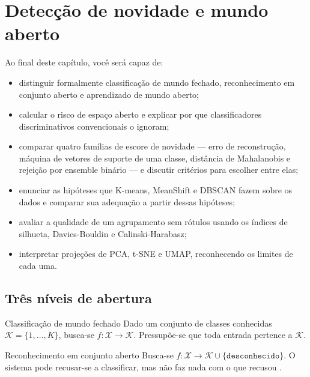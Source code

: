 \chapter{Detecção de novidade e mundo aberto}
\label{cap:novidades}

\begin{objetivos}
Ao final deste capítulo, você será capaz de:
\begin{itemize}[leftmargin=*,itemsep=0.2em]
  \item distinguir formalmente classificação de mundo fechado, reconhecimento em
        conjunto aberto e aprendizado de mundo aberto;
  \item calcular o risco de espaço aberto e explicar por que classificadores
        discriminativos convencionais o ignoram;
  \item comparar quatro famílias de escore de novidade --- erro de reconstrução,
        máquina de vetores de suporte de uma classe, distância de Mahalanobis e
        rejeição por ensemble binário --- e discutir critérios para escolher entre elas;
  \item enunciar as hipóteses que K-means, MeanShift e DBSCAN fazem sobre os dados e
        comparar sua adequação a partir dessas hipóteses;
  \item avaliar a qualidade de um agrupamento sem rótulos usando os índices de silhueta,
        Davies-Bouldin e Calinski-Harabasz;
  \item interpretar projeções de PCA, t-SNE e UMAP, reconhecendo os limites de cada uma.
\end{itemize}
\end{objetivos}

\section{Três níveis de abertura}

\begin{definicao}{Classificação de mundo fechado}
Dado um conjunto de classes conhecidas $\mathcal{K} = \{1, \dots, K\}$, busca-se
$f: \mathcal{X} \to \mathcal{K}$. Pressupõe-se que toda entrada pertence a
$\mathcal{K}$.
\end{definicao}

\begin{definicao}{Reconhecimento em conjunto aberto}
Busca-se $f: \mathcal{X} \to \mathcal{K} \cup \{\texttt{desconhecido}\}$. O sistema pode
recusar-se a classificar, mas não faz nada com o que recusou \citep{Scheirer2013}.
\end{definicao}

